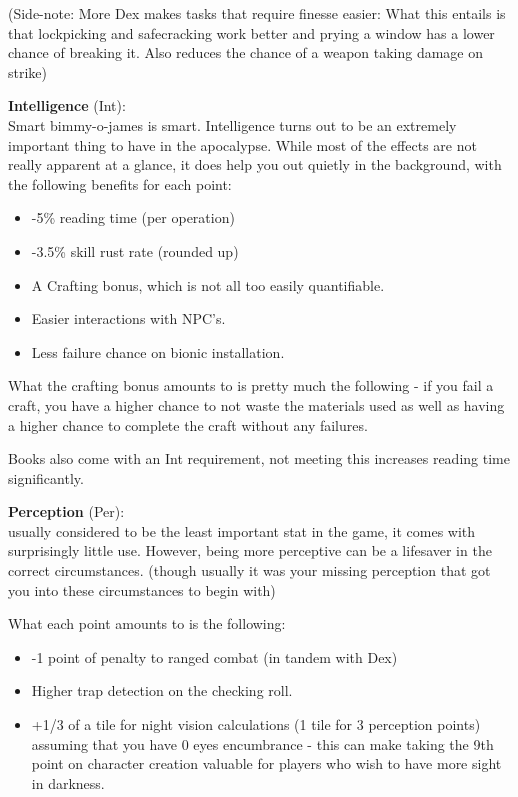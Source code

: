 \documentclass[11pt]{report}
\begin{document}
(Side-note: More Dex makes tasks that require finesse easier: What this entails is that lockpicking and safecracking work better and prying a window has a lower chance of breaking it. Also reduces the chance of a weapon taking damage on strike)

\textbf{Intelligence} (Int):\\Smart bimmy-o-james is smart. Intelligence turns out to be an extremely important thing to have in the apocalypse. While most of the effects are not really apparent at a glance, it does help you out quietly in the background, with the following benefits for each point:
\begin{itemize}
\item -5\% reading time (per operation)
\item -3.5\% skill rust rate (rounded up)
\item A Crafting bonus, which is not all too easily quantifiable.
\item Easier interactions with NPC's.
\item Less failure chance on bionic installation.
\end{itemize}

What the crafting bonus amounts to is pretty much the following - if you fail a craft, you have a higher chance to not waste the materials used as well as having a higher chance to complete the craft without any failures.

Books also come with an Int requirement, not meeting this increases reading time significantly.

\textbf{Perception} (Per):\\usually considered to be the least important stat in the game, it comes with surprisingly little use. However, being more perceptive can be a lifesaver in the correct circumstances. (though usually it was your missing perception that got you into these circumstances to begin with)

What each point amounts to is the following:
\begin{itemize}
\item -1 point of penalty to ranged combat (in tandem with Dex)
\item Higher trap detection on the checking roll.
\item +1/3 of a tile for night vision calculations (1 tile for 3 perception points) assuming that you have 0 eyes encumbrance - this can make taking the 9th point on character creation valuable for players who wish to have more sight in darkness.
\end{itemize}
\end{document}
